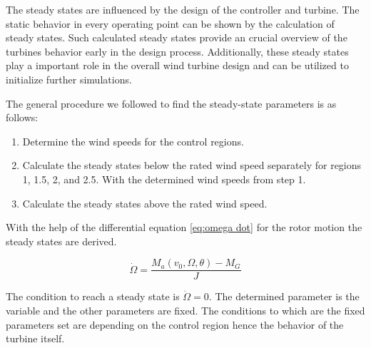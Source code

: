 
The steady states are influenced by the design of the controller and turbine.
The static behavior in every operating point can be shown by the calculation of steady states.
Such calculated steady states provide an crucial overview of the turbines behavior early in the design process.
Additionally, these steady states play a important role in the overall wind turbine design and can be utilized to initialize further simulations.

The general procedure we followed to find the steady-state parameters is as follows: 
\begin{enumerate}
	\item Determine the wind speeds for the control regions. 
	\item Calculate the steady states below the rated wind speed separately for regions 1, 1.5, 2, and 2.5. With the determined wind speeds from step 1.
	\item Calculate the steady states above the rated wind speed.
\end{enumerate}

With the help of the differential equation \ref{eq:omega dot} for the rotor motion the steady states are derived.

\begin{equation}
	\dot{\Omega} = \frac{M_a(v_0, \Omega, \theta) - M_G}{J}
	\label{eq:omega dot}
\end{equation}

The condition to reach a steady state is $\dot{\Omega} = 0$. The determined parameter is the variable and the other parameters are fixed. The conditions to which are the fixed parameters set are depending on the control region hence the behavior of the turbine itself.

%
%
%

